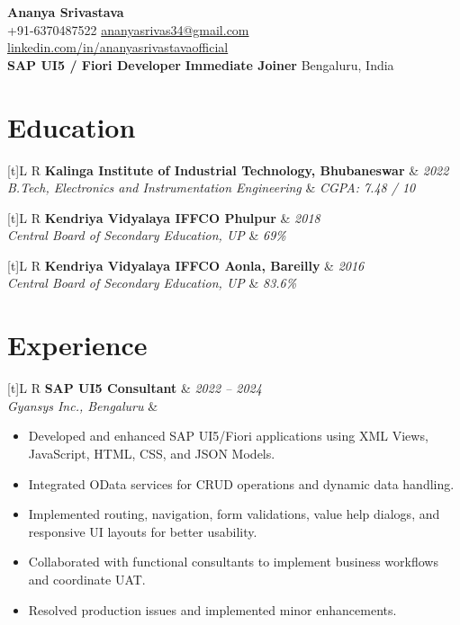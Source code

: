 \documentclass[a4paper,10pt]{article}
\newcommand{\resumeSubheading}[4]{%
  \vspace{1mm}%
  \noindent\begin{tabularx}{\textwidth}[t]{L R}%
    \textbf{#1} & \textit{#2} \\%
    \textit{#3} & \textit{#4} \\%
  \end{tabularx}\vspace{-0.5mm}%
}
\begin{document}
\selectfont
\small

\begin{center}
  {\Large \textbf{Ananya Srivastava}} \\[1.5mm]
  +91-6370487522 \textbar{}
  \href{mailto:ananyasrivas34@gmail.com}{ananyasrivas34@gmail.com} \textbar{}
  \href{https://linkedin.com/in/ananyasrivastavaofficial}{linkedin.com/in/ananyasrivastavaofficial} \\[1.5mm]
  \textbf{SAP UI5 / Fiori Developer} \textbar{} \textbf{Immediate Joiner} \textbar{} Bengaluru, India
\end{center}

\section{Education}
\resumeSubheading
  {Kalinga Institute of Industrial Technology, Bhubaneswar}{2022}
  {B.Tech, Electronics and Instrumentation Engineering}{CGPA: 7.48 / 10}
\resumeSubheading
  {Kendriya Vidyalaya IFFCO Phulpur}{2018}
  {Central Board of Secondary Education, UP}{69\%}
\resumeSubheading
  {Kendriya Vidyalaya IFFCO Aonla, Bareilly}{2016}
  {Central Board of Secondary Education, UP}{83.6\%}

\section{Experience}
\resumeSubheading
  {SAP UI5 Consultant}{2022 -- 2024}
  {Gyansys Inc., Bengaluru}{}
\begin{itemize}
  \item Developed and enhanced SAP UI5/Fiori applications using XML Views, JavaScript, HTML, CSS, and JSON Models.
  \item Integrated OData services for CRUD operations and dynamic data handling.
  \item Implemented routing, navigation, form validations, value help dialogs, and responsive UI layouts for better usability.
  \item Collaborated with functional consultants to implement business workflows and coordinate UAT.
  \item Resolved production issues and implemented minor enhancements.
\end{itemize}
\end{document}
